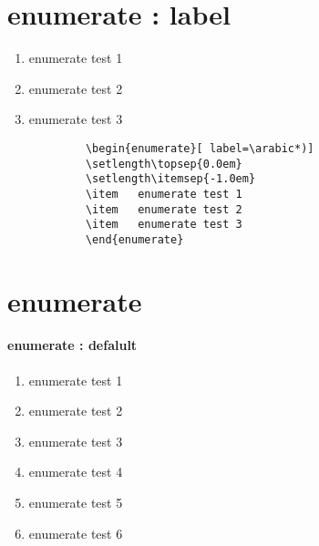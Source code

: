 	\section{enumerate : label}
			\begin{enumerate}[ label=\arabic*)]
			\setlength\topsep{0.0em}
			\setlength\itemsep{-1.0em}
			\item	enumerate test 1
			\item	enumerate test 2
			\item	enumerate test 3
			\end{enumerate}

		\begin{mdframed}[style=code_document, frametitle={code}]
			\begin{verbatim}
			\begin{enumerate}[ label=\arabic*)]
			\setlength\topsep{0.0em}
			\setlength\itemsep{-1.0em}
			\item	enumerate test 1
			\item	enumerate test 2
			\item	enumerate test 3
			\end{enumerate}
			\end{verbatim}
		\end{mdframed}


	\section{enumerate}


		\paragraph{enumerate : defalult}
			\begin{enumerate}
			\setlength\topsep{0.0em}
			\setlength\itemsep{-1.0em}
			\setlength{}
			\setlength{}
	
			\item	enumerate test 1
			\item	enumerate test 2
			\item	enumerate test 3
			\item	enumerate test 4
			\item	enumerate test 5
			\item	enumerate test 6
			\end{enumerate}

